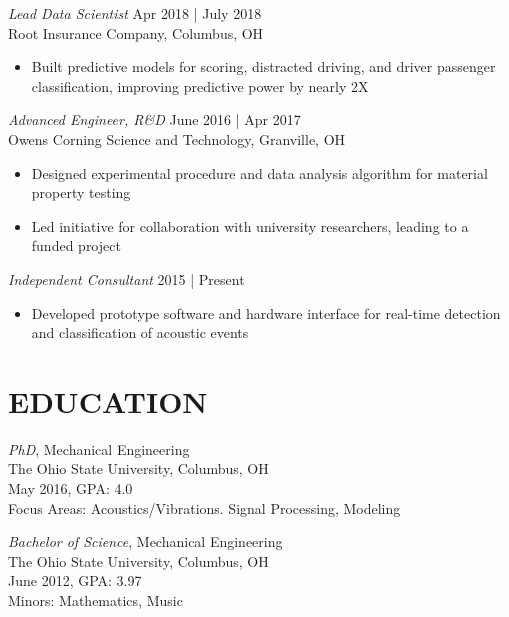 \documentclass[margin]{res}
\begin{document}
\begin{resume}
                {\sl Lead Data Scientist} \hfill Apr 2018 | July 2018 \\
                 Root Insurance Company, Columbus, OH
                 \begin{itemize}  \itemsep -2pt %
                 \item Built predictive models for scoring, distracted driving, and
                       driver passenger classification, improving predictive power by
                       nearly 2X
                 \end{itemize} 
                {\sl Advanced Engineer, R\&D} \hfill June 2016 | Apr 2017 \\
                 Owens Corning Science and Technology, Granville, OH
                 \begin{itemize}
                 \item Designed experimental procedure and data analysis algorithm
                       for material property testing
                 \item Led initiative for collaboration with university
                       researchers, leading to a funded project 
                 \end{itemize}
                {\sl Independent Consultant} \hfill 2015 | Present
                 \begin{itemize} \itemsep -2pt
                 \item Developed prototype software and hardware interface for 
                       real-time detection and classification of acoustic events
                 \end{itemize} 


\section{EDUCATION} 
               {\sl PhD}, Mechanical Engineering \\
                The Ohio State University, Columbus, OH \\
                May 2016, GPA: 4.0 \\
                Focus Areas: Acoustics/Vibrations. Signal Processing, Modeling

                {\sl Bachelor of Science}, Mechanical Engineering \\
                The Ohio State University, Columbus, OH \\ 
                June 2012, GPA: 3.97 \\ 
                Minors: Mathematics, Music 
 

\end{resume}
\end{document}
